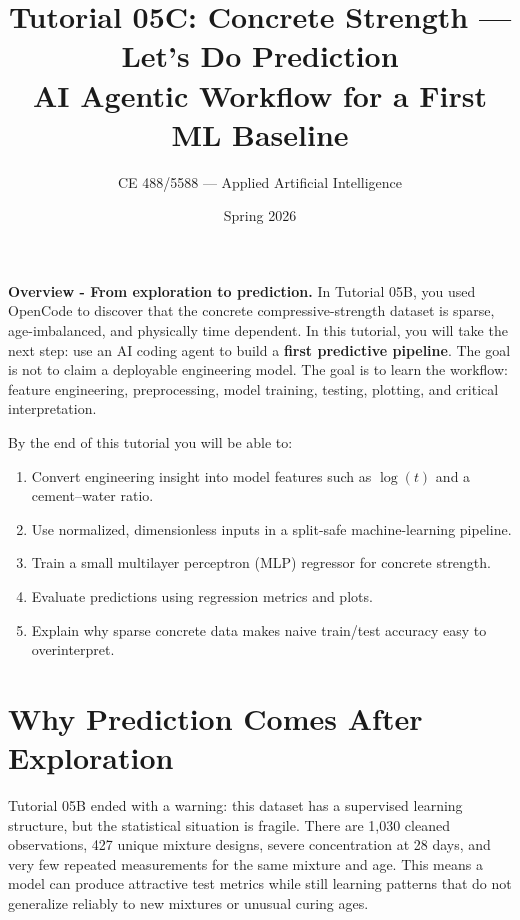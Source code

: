 \documentclass[11pt]{article}
\title{\textbf{Tutorial 05C: Concrete Strength --- Let's Do Prediction}\\[4pt]
       {\large AI Agentic Workflow for a First ML Baseline}}
\author{CE 488/5588 --- Applied Artificial Intelligence}
\date{Spring 2026}
\begin{document}
\maketitle

\begin{def-box}
\textbf{Overview - From exploration to prediction.}
In Tutorial 05B, you used OpenCode to discover that the concrete compressive-strength dataset is sparse, age-imbalanced, and physically time dependent.  In this tutorial, you will take the next step: use an AI coding agent to build a \textbf{first predictive pipeline}.  The goal is not to claim a deployable engineering model.  The goal is to learn the workflow: feature engineering, preprocessing, model training, testing, plotting, and critical interpretation.
\end{def-box}

\begin{ch-box}
By the end of this tutorial you will be able to:
\begin{enumerate}[nosep]
  \item Convert engineering insight into model features such as $\log(t)$ and a cement--water ratio.
  \item Use normalized, dimensionless inputs in a split-safe machine-learning pipeline.
  \item Train a small multilayer perceptron (MLP) regressor for concrete strength.
  \item Evaluate predictions using regression metrics and plots.
  \item Explain why sparse concrete data makes naive train/test accuracy easy to overinterpret.
\end{enumerate}
\end{ch-box}

\section{Why Prediction Comes After Exploration}
\label{sec:why-prediction}

Tutorial 05B ended with a warning: this dataset has a supervised learning structure, but the statistical situation is fragile.  There are 1,030 cleaned observations, 427 unique mixture designs, severe concentration at 28 days, and very few repeated measurements for the same mixture and age.  This means a model can produce attractive test metrics while still learning patterns that do not generalize reliably to new mixtures or unusual curing ages.
\end{document}
